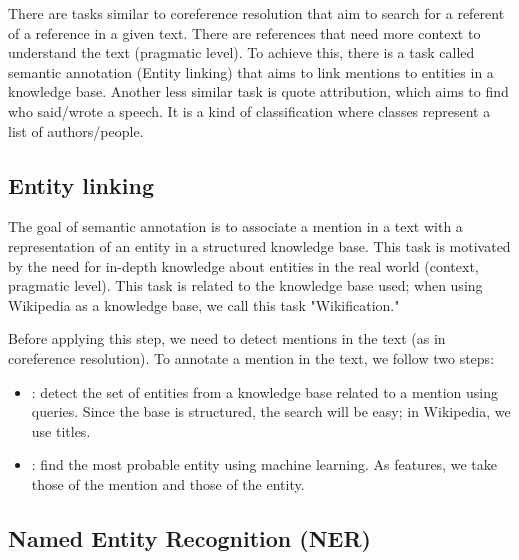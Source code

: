 \documentclass{KBook}
\begin{document}
There are tasks similar to coreference resolution that aim to search for a referent of a reference in a given text. There are references that need more context to understand the text (pragmatic level). To achieve this, there is a task called semantic annotation (Entity linking) that aims to link mentions to entities in a knowledge base. Another less similar task is quote attribution, which aims to find who said/wrote a speech. It is a kind of classification where classes represent a list of authors/people.


\subsection{Entity linking}

The goal of semantic annotation is to associate a mention in a text with a representation of an entity in a structured knowledge base. This task is motivated by the need for in-depth knowledge about entities in the real world (context, pragmatic level). This task is related to the knowledge base used; when using Wikipedia as a knowledge base, we call this task "Wikification."

Before applying this step, we need to detect mentions in the text (as in coreference resolution). To annotate a mention in the text, we follow two steps:
\begin{itemize}
	\item {}: detect the set of entities from a knowledge base related to a mention using queries. Since the base is structured, the search will be easy; in Wikipedia, we use titles.
	\item {}: find the most probable entity using machine learning. As features, we take those of the mention and those of the entity.
\end{itemize}


\subsection{Named Entity Recognition (NER)}
\end{document}
